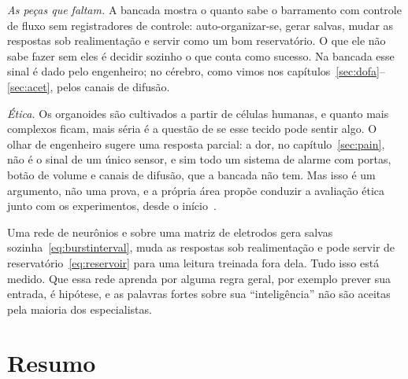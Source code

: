\emph{As peças que faltam.} A bancada mostra o quanto sabe o barramento  com controle de fluxo  sem registradores de controle: auto-organizar-se, gerar salvas, mudar as respostas sob realimentação e servir como um bom reservatório. O que ele não sabe fazer sem eles é decidir sozinho o que conta como sucesso. Na bancada esse sinal é dado pelo engenheiro; no cérebro, como vimos nos capítulos~\ref{sec:dofa}--\ref{sec:acet}, pelos canais de difusão.

\emph{Ética.} Os organoides são cultivados a partir de células humanas, e quanto mais complexos ficam, mais séria é a questão de se esse tecido pode sentir algo. O olhar de engenheiro sugere uma resposta parcial: a dor, no capítulo~\ref{sec:pain}, não é o sinal de um único sensor, e sim todo um sistema de alarme com portas, botão de volume e canais de difusão, que a bancada não tem. Mas isso é um argumento, não uma prova, e a própria área propõe conduzir a avaliação ética junto com os experimentos, desde o início~\cite{Smirnova2023}.

\begin{keyblock}
\begin{proposition}
\label{prop:livingmachine}
Uma rede de neurônios  e  sobre uma matriz de eletrodos gera salvas sozinha~\eqref{eq:burstinterval}, muda as respostas sob realimentação e pode servir de reservatório~\eqref{eq:reservoir} para uma leitura treinada fora dela. Tudo isso está medido. Que essa rede aprenda por alguma regra geral, por exemplo prever sua entrada, é hipótese, e as palavras fortes sobre sua ``inteligência'' não são aceitas pela maioria dos especialistas.
\end{proposition}
\end{keyblock}



\section{Resumo}

